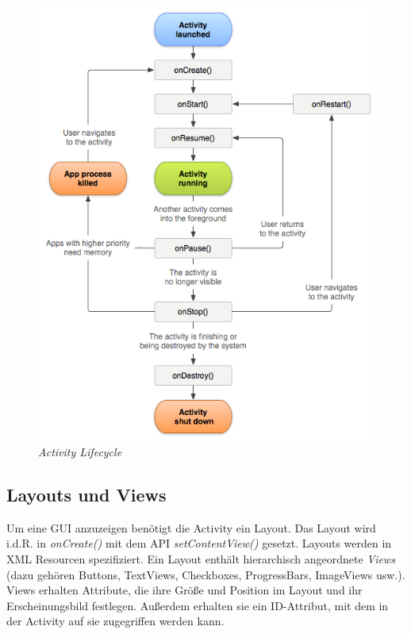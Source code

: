 \begin{figure}[ht]
\centering
\includegraphics[width=\textwidth]{../img/ActivityLifecycle.png}
\caption{\emph{Activity Lifecycle}}
\label{fig:activitylifecycle}
\end{figure}

\subsection{Layouts und Views}

Um eine GUI anzuzeigen benötigt die Activity ein Layout. Das Layout wird i.d.R. in \emph{onCreate()} mit dem API \emph{setContentView()} gesetzt. Layouts werden in XML Resourcen spezifiziert. Ein Layout enthält hierarchisch angeordnete \emph{Views} (dazu gehören Buttons, TextViews, Checkboxes, ProgressBars, ImageViews usw.). Views erhalten Attribute, die ihre Größe und Position im Layout und ihr Erscheinungsbild festlegen. Außerdem erhalten sie ein ID-Attribut, mit dem in der Activity auf sie zugegriffen werden kann.

